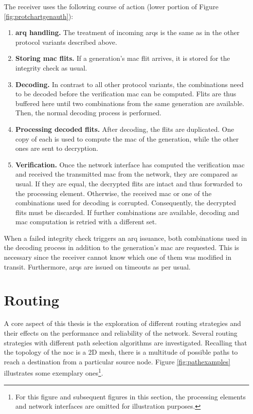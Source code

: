 The receiver uses the following course of action (lower portion of Figure \ref{fig:protchartgenauth}):
\begin{enumerate}
    \item \textbf{\Gls{arq} handling.} The treatment of incoming \glspl{arq} is the same as in the other protocol variants described above.
    \item \textbf{Storing \gls{mac} flits.} If a generation's \gls{mac} flit arrives, it is stored for the integrity check as usual.
    \item \textbf{Decoding.} In contrast to all other protocol variants, the combinations need to be decoded before the verification \gls{mac} can
        be computed. Flits are thus buffered here until two combinations from the same generation are available. Then, the normal decoding process is
        performed.
    \item \textbf{Processing decoded flits.} After decoding, the flits are duplicated. One copy of each is used to compute the \gls{mac} of the
        generation, while the other ones are sent to decryption.
    \item \textbf{Verification.} Once the network interface has computed the verification \gls{mac} and received the transmitted \gls{mac} from the
        network, they are compared as usual. If they are equal, the decrypted flits are intact and thus forwarded to the processing element.
        Otherwise, the received \gls{mac} or one of the combinations used for decoding is corrupted. Consequently, the decrypted flits must be
        discarded. If further combinations are available, decoding and \gls{mac} computation is retried with a different set.
\end{enumerate}
\vspace{0.5\baselineskip}

When a failed integrity check triggers an \gls{arq} issuance, both combinations used in the decoding process in addition to the generation's
\gls{mac} are requested. This is necessary since the receiver cannot know which one of them was modified in transit. Furthermore, \glspl{arq} are
issued on timeouts as per usual.

\section{Routing}
A core aspect of this thesis is the exploration of different routing strategies and their effects on the performance and reliability of
the network. Several routing strategies with different path selection algorithms are investigated. Recalling that the topology of the
\gls{noc} is a 2D mesh, there is a multitude of possible paths to reach a destination from a particular source node. Figure \vref{fig:pathexamples}
illustrates some exemplary ones\footnote{For this figure and subsequent figures in this section, the processing elements and network interfaces are
omitted for illustration purposes.}.


